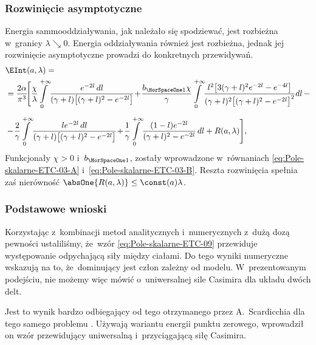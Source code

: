 \documentclass[10pt,t]{beamer}
\begin{document}
\begin{frame}
  \frametitle{Rozwinięcie asymptotyczne}


  Energia sammooddziaływania, jak należało się spodziewać, jest rozbieżna
  w~granicy $\lambda \searrow 0$. Energia oddziaływania również jest rozbieżna, jednak
  jej rozwinięcie asymptotyczne prowadzi do konkretnych przewidywań.
  \begin{equation}
    \label{eq:Pole-skalarne-ETC-09}
    \begin{split}
      &\EInt( a, \lambda ) = \\
      &=
        \frac{ 2 \alpha }{ \pi^{ 3 } } \! \Bigg[ \frac{ \chi }{ \lambda } \!
        \int\limits_{ 0 }^{ +\infty } \!
        \frac{ e^{ -2 l } \, dl }{ ( \gamma + l )
        \big[ ( \gamma + l )^{ 2 } - e^{ -2 l } \big] } \! + \!
        \frac{ b_{ \HorSpaceOne 1 } \chi }{ \gamma } \!
        \int\limits_{ 0 }^{ +\infty } \!
        \frac{ l^{ 2 } \big[ 3 ( \gamma + l )^{ 2 } e^{ -2 l } -
        e^{ -4 l } \big] }
        { ( \gamma + l )^{ 2 }
        \big[ ( \gamma + l )^{ 2 } - e^{ -2 l } \big]^{ 2 } } dl
        \, - \\[0.5em]
      &- \! \frac{ 2 }{ \gamma } \! \int\limits_{ 0 }^{ +\infty } \!
        \frac{ l e^{ -2 l }\, dl }{ ( \gamma + l )
        \big[ ( \gamma + l )^{ 2 } - e^{ -2 l } \big] } \! + \!
        \frac{ 1 }{ \gamma } \!
        \int\limits_{ 0 }^{ +\infty } \! \frac{ ( 1 - l ) e^{ -2 l } }{
        ( \gamma + l )^{ 2 } - e^{ -2 l } } \, dl + R( a, \lambda ) \Bigg],
    \end{split}
  \end{equation}
  Funkcjonały $\chi > 0$ i~$b_{ \HorSpaceOne 1 }$, zostały wprowadzone
  w~równaniach \eqref{eq:Pole-skalarne-ETC-03-A}
  i~\eqref{eq:Pole-skalarne-ETC-03-B}. Reszta rozwinięcia spełnia zaś
  nierówność $\absOne{ R( a, \lambda ) } \leq \const( a ) \lambda$.

\end{frame}





\begin{frame}
  \frametitle{Podstawowe wnioski}


  Korzystając z~kombinacji metod analitycznych i~numerycznych z~dużą
  dozą pewności ustaliliśmy, że~wzór
  \eqref{eq:Pole-skalarne-ETC-09} przewiduje występowanie
  \alert{odpychającą} siły między ciałami. Do tego wyniki numeryczne
  wskazują na to, że~dominujący jest człon \alert{zależny od modelu}.
  W~prezentowanym podejściu, nie możemy więc mówić o~uniwersalnej sile
  Casimira dla układu dwóch delt.

  Jest to wynik bardzo odbiegający od tego otrzymanego przez A.~Scardicchia
  dla tego samego problemu
  \parencite{Scardicchio-Casimir-dynamics-ETC-2005}. Używają wariantu
  energii punktu zerowego, wprowadził on wzór przewidujący
  \alert{uniwersalną} i~\alert{przyciągającą} siłę Casimira.

\end{frame}
\end{document}
